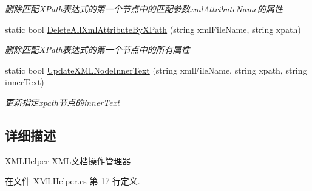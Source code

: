 \begin{DoxyCompactItemize}
\begin{DoxyCompactList}\small\item\em 删除匹配\-X\-Path表达式的第一个节点中的匹配参数xml\-Attribute\-Name的属性 \end{DoxyCompactList}\item 
static bool \hyperlink{class_x_c_l_net_tools_1_1_x_m_l_1_1_x_m_l_helper_a07059a8c89a84c359cc9893c842a263e}{Delete\-All\-Xml\-Attribute\-By\-X\-Path} (string xml\-File\-Name, string xpath)
\begin{DoxyCompactList}\small\item\em 删除匹配\-X\-Path表达式的第一个节点中的所有属性 \end{DoxyCompactList}\item 
static bool \hyperlink{class_x_c_l_net_tools_1_1_x_m_l_1_1_x_m_l_helper_a680dbf5fec70c3e5e30d0f75fedc2d3c}{Update\-X\-M\-L\-Node\-Inner\-Text} (string xml\-File\-Name, string xpath, string inner\-Text)
\begin{DoxyCompactList}\small\item\em 更新指定xpath节点的inner\-Text \end{DoxyCompactList}\end{DoxyCompactItemize}


\subsection{详细描述}
\hyperlink{class_x_c_l_net_tools_1_1_x_m_l_1_1_x_m_l_helper}{X\-M\-L\-Helper} X\-M\-L文档操作管理器 



在文件 X\-M\-L\-Helper.\-cs 第 17 行定义.



